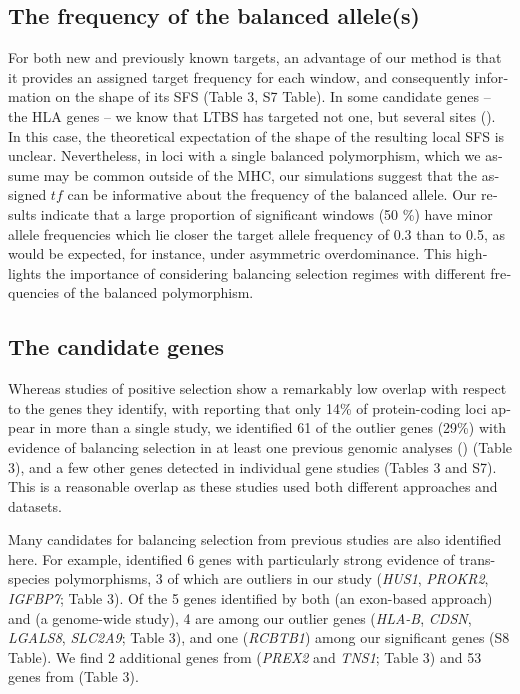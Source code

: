 \begin{refsection}
\begin{otherlanguage}{english}
\subsection{The frequency of the balanced allele(s)}
For both new and previously known targets, an advantage of our method is that it provides an assigned target frequency for each window, and consequently information on the shape of its SFS (Table 3, S7 Table). In some candidate genes – the HLA genes – we know that LTBS has targeted not one, but several sites (\cite{Hughes1988,Hughes1989}). In this case, the theoretical expectation of the shape of the resulting local SFS is unclear. Nevertheless, in loci with a single balanced polymorphism, which we assume may be common outside of the MHC, our simulations suggest that the assigned $tf$ can be informative about the frequency of the balanced allele. Our results indicate that a large proportion of significant windows (50 \%) have minor allele frequencies which lie closer the target allele frequency of 0.3 than to 0.5, as would be expected, for instance, under asymmetric overdominance. This highlights the importance of considering balancing selection regimes with different frequencies of the balanced polymorphism.



\subsection{The candidate genes}

Whereas studies of positive selection show a remarkably low overlap with respect to the genes they identify, with \textcite{Akey2009} reporting that only 14\% of protein-coding loci appear in more than a single study, we identified 61 of the outlier genes (29\%) with evidence of balancing selection in at least one previous genomic analyses (\cite{Andres2009,DeGiorgio2014,Leffler2013a}) (Table 3), and a few other genes detected in individual gene studies (Tables 3 and S7).
This is a reasonable overlap as these studies used both different approaches and datasets. 

Many candidates for balancing selection from previous studies are also identified here. For example, \textcite{Leffler2013a} identified 6 genes with particularly strong evidence of trans-species polymorphisms, 3 of which are outliers in our study (\emph{HUS1}, \emph{PROKR2}, \emph{IGFBP7}; Table 3). Of the 5 genes identified by both \textcite{Andres2009} (an exon-based approach) and \textcite{DeGiorgio2014} (a genome-wide study), 4 are among our outlier genes (\emph{HLA-B}, \emph{CDSN}, \emph{LGALS8}, \emph{SLC2A9}; Table 3), and one (\emph{RCBTB1}) among our significant genes (S8 Table). We find 2 additional genes from \textcite{Andres2009} (\emph{PREX2} and \emph{TNS1}; Table 3) and 53 genes from \textcite{DeGiorgio2014} (Table 3).


\end{otherlanguage}
\end{refsection}
